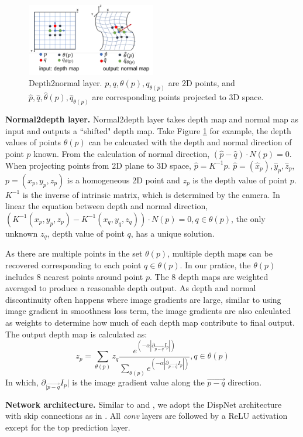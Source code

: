\begin{figure}
\centering
\includegraphics[width=0.5\textwidth]{figures/d2n.pdf}
\caption{Depth2normal layer. $p, q, \theta(p), q_{\theta(p)}$ are 2D points, and $\hat{p}, \hat{q}, \hat{\theta}(p), \hat{q}_{\theta(p)}$ are corresponding points projected to 3D space.}
\label{fig:d2n}
\end{figure}

\textbf{Normal2depth layer.} Normal2depth layer takes depth map and normal map as input and outputs a ``shifted" depth map. Take Figure \ref{fig:d2n} for example, the depth values of points $\theta(p)$ can be calcuated with the depth and normal direction of point $p$ known. From the calculation of normal direction, $(\hat{p} - \hat{q}) \cdot N(p) = 0$. When projecting points from 2D plane to 3D space, $\hat{p} = K^{-1}p$. $\hat{p} = (\hat{x}_p),\hat{y}_p,\hat{z}_p$, $p = (x_p, y_p, z_p)$ is a homogeneous 2D point and $z_p$ is the depth value of point $p$. $K^{-1}$ is the inverse of intrinsic matrix, which is determined by the camera. In linear the equation between depth and normal direction, $(K^{-1}(x_p, y_p, z_p) - K^{-1}(x_q, y_q, z_q))\cdot N(p) = 0, q\in\theta(p)$, the only unknown $z_q$, \ie  depth value of point $q$, has a unique solution. 

As there are multiple points in the set $\theta(p)$, multiple depth maps can be recovered corresponding to each point $q \in \theta(p)$. In our pratice, the $\theta(p)$ includes 8 nearest points around point $p$. The 8 depth maps are weighted averaged to produce a reasonable depth output. As depth and normal discontinuity often happens where image gradients are large, similar to using image gradient in smoothness loss term, the image gradients are also calculated as weights to determine how much of each depth map contribute to final output. The output depth map is calculated as:
$$z_p = \sum_{\theta(p)}z_q\frac{e^{(-\alpha|\partial_{\overrightarrow{p-q}}I_p|)}}{\sum_{\theta(p)}e^{(-\alpha|\partial_{\overrightarrow{p-q}}I_p|)}}, q\in\theta(p)$$
In which, $\partial_{|\overrightarrow{p-q}}I_p|$ is the image gradient value along the $\overrightarrow{p-q}$ direction.

\textbf{Network architecture.} Similar to \cite{zhou2017unsupervised} and \cite{godard2016unsupervised}, we adopt the DispNet \cite{mayer2016large} architecture with skip connections as in \cite{zhou2017unsupervised}. All \textit{conv} layers are followed by a ReLU activation except for the top prediction layer. 
